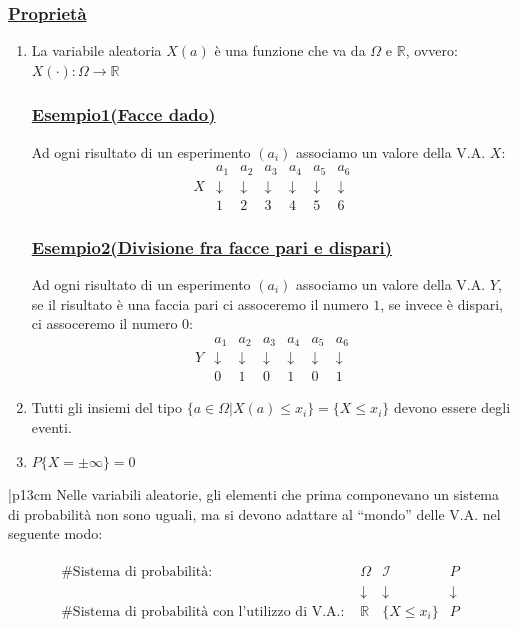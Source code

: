 \documentclass{article}
\begin{document}
\subsubsection{\underline{Proprietà}}
\begin{enumerate}
    \item La variabile aleatoria $X(a)$ è una funzione che va da $\Omega$ e $\mathbb{R}$, ovvero: $X(\cdot) : \Omega \rightarrow \mathbb{R}$
    \subsubsection{\underline{Esempio1(Facce dado)}}
    Ad ogni risultato di un esperimento $\left( a_i \right)$ associamo un valore della V.A. $X$: 
    \[\begin{matrix}
    & a_1 & a_2 & a_3 & a_4 & a_5 & a_6 \\
    X& \downarrow & \downarrow & \downarrow & \downarrow & \downarrow & \downarrow \\
    & 1 & 2 & 3 & 4 & 5 & 6
    \end{matrix}\]
    \subsubsection{\underline{Esempio2(Divisione fra facce pari e dispari)}}
    Ad ogni risultato di un esperimento $\left( a_i \right)$ associamo un valore della V.A. $Y$, se il risultato è una faccia pari ci assoceremo il numero $1$, se invece è dispari, ci assoceremo il numero $0$:
    \[\begin{matrix}
    & a_1 & a_2 & a_3 & a_4 & a_5 & a_6 \\
    Y & \downarrow & \downarrow & \downarrow & \downarrow & \downarrow & \downarrow \\
    & 0 & 1 & 0 & 1 & 0 & 1
    \end{matrix}\]
    \item Tutti gli insiemi del tipo $\Big\{ a \in \Omega \big| X(a) \leq x_i \Big\} = \big\{X \leq x_i \big\}$ devono essere degli eventi.
    \item $P\{X = \pm \infty \} = 0$
\end{enumerate}
\begin{tabular}{|p{13cm}}
Nelle variabili aleatorie, gli elementi che prima componevano un sistema di probabilità non sono uguali, ma si devono adattare al “mondo” delle V.A.  nel seguente modo: \\ \\
\[\begin{matrix}
\#\text{Sistema di probabilità: } & \Omega & \mathcal{I} & P\\
 & \downarrow & \downarrow & \downarrow\\
\#\text{Sistema di probabilità con l'utilizzo di V.A.: } & \mathbb{R} & \big\{X \leq x_i\big\} & P
\end{matrix}\]
\end{tabular}
\end{document}
